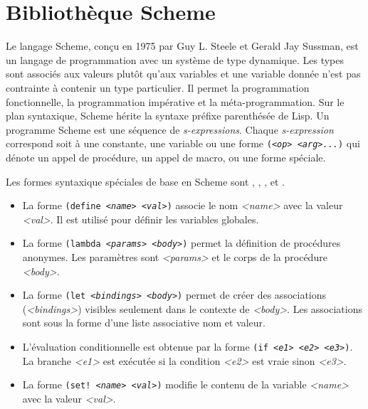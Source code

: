 
\chapter{Bibliothèque Scheme}

Le langage Scheme\cite{Clinger:2008:SCH:1529966.1529973}, conçu en 1975 par Guy
L. Steele et Gerald Jay Sussman, est un langage de programmation avec un
système de type dynamique.  Les types sont associés aux valeurs plutôt qu'aux
variables et une variable donnée n'est pas contrainte à contenir un type
particulier.  Il permet la programmation fonctionnelle, la programmation
impérative et la méta-programmation. Sur le plan syntaxique, Scheme hérite la
syntaxe préfixe parenthésée de Lisp.  Un programme Scheme est une séquence de
\textit{s-expressions}.  Chaque \textit{s-expression} correspond soit à une
constante, une variable ou une forme \texttt{(\textit{<op>} \textit{<arg>...})}
qui dénote un appel de procédure, un appel de macro, ou une forme spéciale.

Les formes syntaxique spéciales de base en Scheme sont , ,
,  et .
\begin{itemize}
  \item La forme \texttt{(define \textit{<name>} \textit{<val>})} associe le nom \textit{<name>} avec
    la valeur \textit{<val>}. Il est utilisé pour définir les variables globales.

  \item La forme \texttt{(lambda \textit{<params>} \textit{<body>})} permet la définition de
    procédures anonymes. Les paramètres sont \textit{<params>} et le corps
    de la procédure \textit{<body>}.

  \item La forme \texttt{(let \textit{<bindings>} \textit{<body>})} permet de créer des
    associations (\textit{<bindings>}) visibles seulement dans le contexte de
    \textit{<body>}. Les associations sont sous la forme d'une liste
    associative nom et valeur.

  \item L'évaluation conditionnelle est obtenue par la forme \texttt{(if \textit{<e1>} \textit{<e2>} \textit{<e3>})}.
    La branche \textit{<e1>} est exécutée si la condition \textit{<e2>} est
    vraie sinon \textit{<e3>}.

  \item La forme \texttt{(set! \textit{<name>} \textit{<val>})} modifie le contenu de la variable
    \textit{<name>} avec la valeur \textit{<val>}.
\end{itemize}

